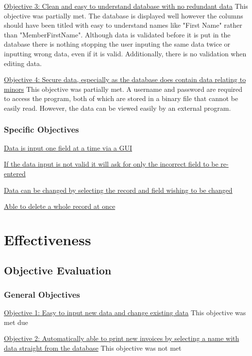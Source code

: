 \underline{Objective 3: Clean and easy to understand database with no redundant data}
This objective was partially met. The database is displayed well however the columns should have been titled with easy to understand names like "First Name" rather than "MemberFirstName". Although data is validated before it is put in the database there is nothing stopping the user inputing the same data twice or inputting wrong data, even if it is valid. Additionally, there is no validation when editing data.

\underline{Objective 4: Secure data, especially as the database does contain data relating to minors}
This objective was partially met. A username and password are required to access the program, both of which are stored in a binary file that cannot be easily read. However, the data can be viewed easily by an external program.

\subsubsection{Specific Objectives}
\underline{Data is input one field at a time via a GUI}


\underline{If the data input is not valid it will ask for only the incorrect field to be re-entered}


\underline{Data can be changed by selecting the record and field wishing to be changed}


\underline{Able to delete a whole record at once}


\section{Effectiveness}

\subsection{Objective Evaluation}

\subsubsection{General Objectives}
\underline{Objective 1: Easy to input new data and change existing data}
This objective was met due

\underline{Objective 2: Automatically able to print new invoices by selecting a name with data straight from the database}
This objective was not met

